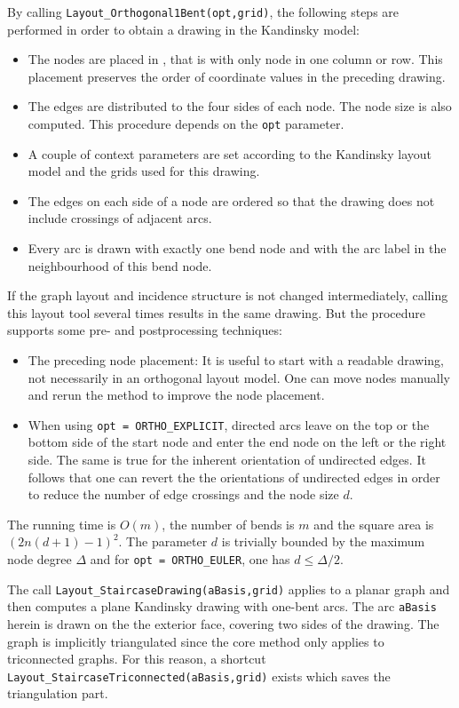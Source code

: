\documentclass[a4paper,11pt,twoside]{book}
\begin{document}
\begin{multicols}{2}
By calling \verb/Layout_Orthogonal1Bent(opt,grid)/, the following steps
are performed in order to obtain a drawing in the Kandinsky model:
\begin{itemize}
\item The nodes are placed in , that is with only node
    in one column or row. This placement preserves the order of coordinate
    values in the preceding drawing.
\item The edges are distributed to the four sides of each node. The node size
    is also computed. This procedure depends on the \verb/opt/ parameter.
\item A couple of context parameters are set according to the Kandinsky layout
    model and the grids used for this drawing.
\item The edges on each side of a node are ordered so that the drawing does
    not include crossings of adjacent arcs.
\item Every arc is drawn with exactly one bend node and with the arc
    label in the neighbourhood of this bend node.
\end{itemize}
If the graph layout and incidence structure is not changed intermediately,
calling this layout tool several times results in the same drawing. But 
the procedure supports some pre- and postprocessing techniques:
\begin{itemize}
\item The preceding node placement: It is useful to start with a readable
    drawing, not necessarily in an orthogonal layout model. One can move
    nodes manually and rerun the method to improve the node placement.
\item When using \verb/opt = ORTHO_EXPLICIT/, directed arcs leave on the
    top or the bottom side of the start node and enter the end node on the
    left or the right side. The same is true for the inherent orientation of
    undirected edges. It follows that one can revert the the orientations
    of undirected edges in order to reduce the number of edge crossings
    and the node size $d$.
\end{itemize}
The running time is $O(m)$, the number of bends is $m$ and the square area is
$(2n(d+1)-1)^2$. The parameter $d$ is trivially bounded by the maximum node
degree $\Delta$ and for \verb/opt = ORTHO_EULER/, one has $d\leq\Delta/2$.

The call \verb/Layout_StaircaseDrawing(aBasis,grid)/ applies to a planar graph
and then computes a plane Kandinsky drawing with one-bent arcs. The arc
\verb/aBasis/ herein is drawn on the the exterior face, covering two sides of
the drawing. The graph is implicitly triangulated since the core method only
applies to triconnected graphs. For this reason, a shortcut
\verb/Layout_StaircaseTriconnected(aBasis,grid)/ exists which saves the
triangulation part.


\end{multicols}
\end{document}
